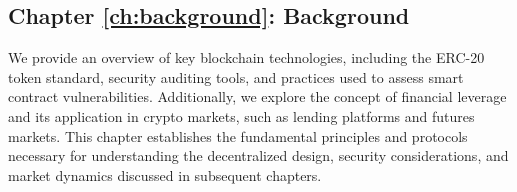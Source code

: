 	
	
%


\subsection*{Chapter \ref{ch:background}: Background} We provide an overview of key blockchain technologies, including the ERC-20 token standard, security auditing tools, and practices used to assess smart contract vulnerabilities. Additionally, we explore the concept of financial leverage and its application in crypto markets, such as lending platforms and futures markets. This chapter establishes the fundamental principles and protocols necessary for understanding the decentralized design, security considerations, and market dynamics discussed in subsequent chapters.

